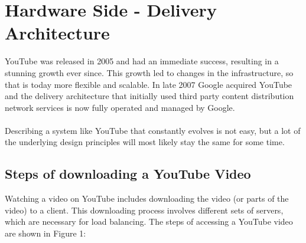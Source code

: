 \section{Hardware Side - Delivery Architecture} 

YouTube was released in 2005 and had an immediate success, resulting in a stunning growth ever since. This growth led to changes in the infrastructure, so that is today more flexible and scalable. In late 2007 Google acquired YouTube and the delivery architecture that initially used third party content distribution network services is now fully operated and managed by Google.
\\
\\
Describing a system like YouTube that constantly evolves is not easy, but a lot of the underlying design principles will most likely stay the same for some time.

\subsection{Steps of downloading a YouTube Video}

Watching a video on YouTube includes downloading the video (or parts of the video) to a client. This downloading process involves different sets of servers, which are necessary for load balancing. The steps of accessing a YouTube video are shown in Figure 1:
